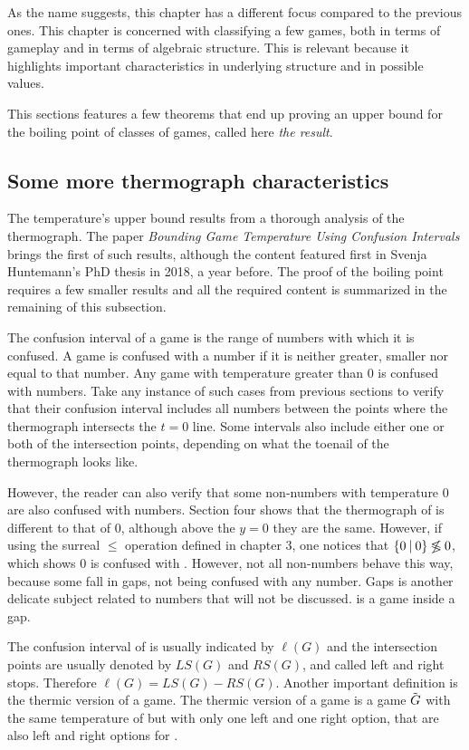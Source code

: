As the name suggests, this chapter has a different focus compared to the previous ones. This chapter is concerned with classifying a few games, both in terms of gameplay and in terms of algebraic structure. This is relevant because it highlights important characteristics in underlying structure and in possible values.

This sections features a few theorems that end up proving an upper bound for the boiling point of classes of games, called here \textit{the result}.

\subsection*{Some more thermograph characteristics}

The temperature's upper bound results from a thorough analysis of the thermograph. The paper \textit{Bounding Game Temperature Using Confusion
Intervals} \cite{12} brings the first of such results, although the content featured first in Svenja Huntemann's PhD thesis \cite{5} in 2018, a year before. The proof of the boiling point requires a few smaller results and all the required content is summarized in the remaining of this subsection.

The confusion interval of a game is the range of numbers with which it is confused. A game is confused with a number if it is neither greater, smaller nor equal to that number. Any game with temperature greater than 0 is confused with numbers. Take any instance of such cases from previous sections to verify that their confusion interval includes all numbers between the points where the thermograph intersects the $t=0$ line. Some intervals also include either one or both of the intersection points, depending on what the toenail of the thermograph looks like.

However, the reader can also verify that some non-numbers with temperature 0 are also confused with numbers. Section four shows that the thermograph of  is different to that of 0, although above the $y=0$ they are the same. However, if using the surreal $\leq$ operation defined in chapter 3, one notices that $\mbox{$\{0\:|\:0\}$} \not\lessgtr 0$, which shows $0$ is confused with . However, not all non-numbers behave this way, because some fall in gaps, not being confused with any number. Gaps is another delicate subject related to numbers that will not be discussed.  is a game inside a gap.

The confusion interval of \Gm{} is usually indicated by $\ell(G)$ and the intersection points are usually denoted by $LS(G)$ and $RS(G)$, and called left and right stops. Therefore $\ell(G) = LS(G)-RS(G)$. Another important definition is the thermic version of a game. The thermic version of a game \Gm{} is a game $\tilde{\mbox{$G$}}$ with the same temperature of \Gm{} but with only one left and one right option, that are also left and right options for \Gm{}.

